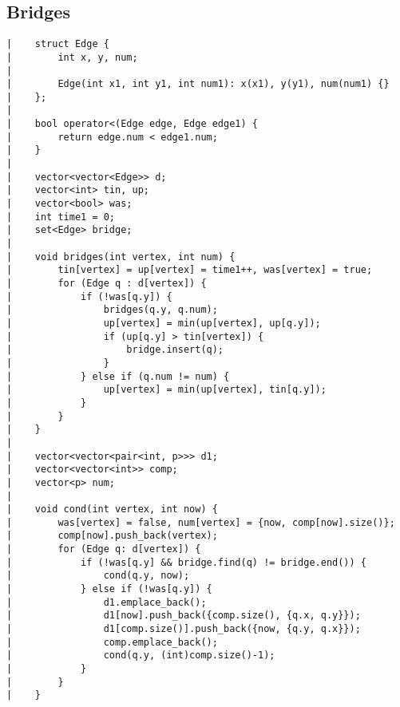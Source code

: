 \documentclass[a4paper, 10pt]{article}
\begin{document}
\begin{center}
\section*{Bridges}
\begin{verbatim}
|    struct Edge {
|        int x, y, num;
|    
|        Edge(int x1, int y1, int num1): x(x1), y(y1), num(num1) {}
|    };
|    
|    bool operator<(Edge edge, Edge edge1) {
|        return edge.num < edge1.num;
|    }
|    
|    vector<vector<Edge>> d;
|    vector<int> tin, up;
|    vector<bool> was;
|    int time1 = 0;
|    set<Edge> bridge;
|    
|    void bridges(int vertex, int num) {
|        tin[vertex] = up[vertex] = time1++, was[vertex] = true;
|        for (Edge q : d[vertex]) {
|            if (!was[q.y]) {
|                bridges(q.y, q.num);
|                up[vertex] = min(up[vertex], up[q.y]);
|                if (up[q.y] > tin[vertex]) {
|                    bridge.insert(q);
|                }
|            } else if (q.num != num) {
|                up[vertex] = min(up[vertex], tin[q.y]);
|            }
|        }
|    }
|    
|    vector<vector<pair<int, p>>> d1;
|    vector<vector<int>> comp;
|    vector<p> num;
|    
|    void cond(int vertex, int now) {
|        was[vertex] = false, num[vertex] = {now, comp[now].size()};
|        comp[now].push_back(vertex);
|        for (Edge q: d[vertex]) {
|            if (!was[q.y] && bridge.find(q) != bridge.end()) {
|                cond(q.y, now);
|            } else if (!was[q.y]) {
|                d1.emplace_back();
|                d1[now].push_back({comp.size(), {q.x, q.y}});
|                d1[comp.size()].push_back({now, {q.y, q.x}});
|                comp.emplace_back();
|                cond(q.y, (int)comp.size()-1);
|            }
|        }
|    }
\end{verbatim}


\end{center}
\end{document}
